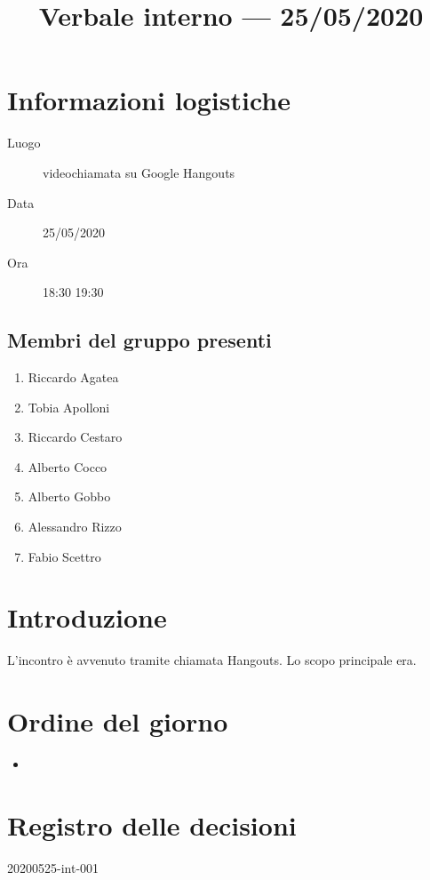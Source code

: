 \documentclass{article}
\title{Verbale interno --- 25/05/2020}
\begin{document}


\section{Informazioni logistiche}%
\label{sec:informazioni_logistiche}

\begin{description}
  \item [Luogo] videochiamata su Google Hangouts
  \item [Data] 25/05/2020
  \item [Ora] 18:30  19:30
\end{description}

\subsection{Membri del gruppo presenti}%
\label{sub:membri_del_gruppo_presenti}

\begin{enumerate}
  \item Riccardo Agatea
  \item Tobia Apolloni
  \item Riccardo Cestaro
  \item Alberto Cocco
  \item Alberto Gobbo
  \item Alessandro Rizzo
  \item Fabio Scettro
\end{enumerate}

\section{Introduzione}%
\label{sec:introduzione}
L'incontro è avvenuto tramite chiamata Hangouts.
Lo scopo principale era.

\section{Ordine del giorno}%
\label{sec:ordine_del_giorno}

\begin{itemize}
  \item
\end{itemize}

\section{}%
\label{sec:}

\newpage
\section{Registro delle decisioni}%
\label{sec:registro_delle_decisioni}

\begin{description}
  \item[20200525-int-001]
\end{description}

\end{document}

